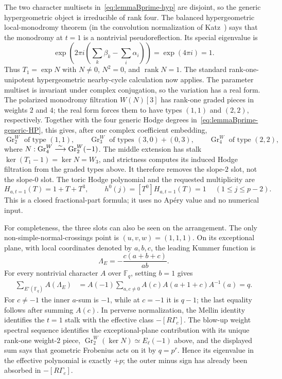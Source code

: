 The two character multisets in~\eqref{eq:lemmaBprime-hyp} are disjoint, so
the generic hypergeometric object is irreducible of rank four.  The balanced
hypergeometric local-monodromy theorem (in the convolution normalization of
Katz~\cite{Katz2012}) says that the monodromy at $t=1$ is a nontrivial
pseudoreflection.  Its special eigenvalue is
\[
 \exp\!\left(2\pi i\left(\sum_k\beta_k-
                  \sum_i\alpha_i\right)\right)=\exp(4\pi i)=1.
\]
Thus $T_1=\exp N$ with $N\ne0$, $N^2=0$, and $\operatorname {rank}N=1$.
The standard rank-one-unipotent hypergeometric nearby-cycle calculation now
applies.  The parameter multiset is invariant under complex conjugation, so
the variation has a real form.  The polarized monodromy filtration $W(N)[3]$
has rank-one graded pieces in weights $2$ and $4$; the real form forces them
to have types $(1,1)$ and $(2,2)$, respectively.  Together with the four
generic Hodge degrees in~\eqref{eq:lemmaBprime-generic-HP}, this gives, after
one complex coefficient embedding,
\[
 \operatorname {Gr}_2^W\text{ of type }(1,1),\qquad
 \operatorname {Gr}_3^W\text{ of types }(3,0)+(0,3),\qquad
 \operatorname {Gr}_4^W\text{ of type }(2,2),
\]
where $N:\operatorname {Gr}_4^W\buildrel\sim\over\longrightarrow
\operatorname {Gr}_2^W(-1)$.  The middle extension has stalk
$\ker(T_1-1)=\ker N=W_3$, and strictness computes its induced Hodge
filtration from the graded types above.
It therefore removes the slope-$2$ slot, not the slope-$0$ slot.  The toric Hodge polynomial
and the requested multiplicity are
\begin{equation}
 H_{a,t=1}(T)=1+T+T^3,\qquad
 \boxed{\ h^0(j)=[T^0]H_{a,t=1}(T)=1\ }
 \quad(1\leq j\leq p-2).
 \label{eq:lemmaBprime-h0}
\end{equation}
This is a closed fractional-part formula; it uses no Ap\'ery value and no
numerical input.

For completeness, the three slots can also be seen on the arrangement.
The only non-simple-normal-crossings point is $(u,v,w)=(1,1,1)$.  On its
exceptional plane, with local coordinates denoted by $a,b,c$, the leading
Kummer function is
\[
 \Lambda_E=-\frac{c(a+b+c)}{ab}.
\]
For every nontrivial character $A$ over $\mathbb F_q$, setting $b=1$ gives
\begin{align*}
 \sum_{E^\circ(\mathbb F_q)}A(\Lambda_E)
 &=A(-1)\sum_{a,c\ne0}A(c)A(a+1+c)A^{-1}(a)=q.
\end{align*}
For $c\ne-1$ the inner $a$-sum is $-1$, while at $c=-1$ it is $q-1$;
the last equality follows after summing $A(c)$.  In perverse normalization,
the Mellin identity identifies the $t=1$ stalk with the effective class
$-[R\Gamma_c]$.  The blow-up weight spectral sequence identifies the
exceptional-plane contribution with its unique rank-one weight-$2$ piece,
$\operatorname {Gr}_2^W(\ker N)\simeq E_\ell(-1)$ above, and the displayed
sum says that geometric Frobenius acts on it by $q=p^r$.  Hence its
eigenvalue in the effective polynomial is exactly $+p$; the outer minus sign
has already been absorbed in $-[R\Gamma_c]$.

